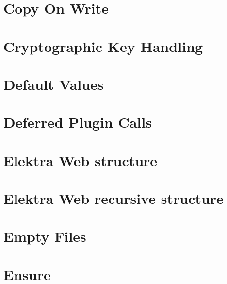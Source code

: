 \let\mypdfximage\pdfximage\def\pdfximage{\immediate\mypdfximage}\documentclass[twoside]{book}
\newcommand{\+}{\discretionary{\mbox{\scriptsize$\hookleftarrow$}}{}{}}
\begin{document}
\chapter{Copy On Write}
\label{doc_decisions_6_implemented_copy_on_write_md}

\chapter{Cryptographic Key Handling}
\label{doc_decisions_6_implemented_cryptograhic_key_handling_md}

\chapter{Default Values}
\label{doc_decisions_6_implemented_default_values_md}

\chapter{Deferred Plugin Calls}
\label{doc_decisions_6_implemented_deferred_plugin_calls_md}

\chapter{Elektra Web structure}
\label{doc_decisions_6_implemented_elektra_web_md}

\chapter{Elektra Web recursive structure}
\label{doc_decisions_6_implemented_elektra_web_recursive_md}

\chapter{Empty Files}
\label{doc_decisions_6_implemented_empty_files_md}

\chapter{Ensure}
\label{doc_decisions_6_implemented_ensure_md}

\end{document}
